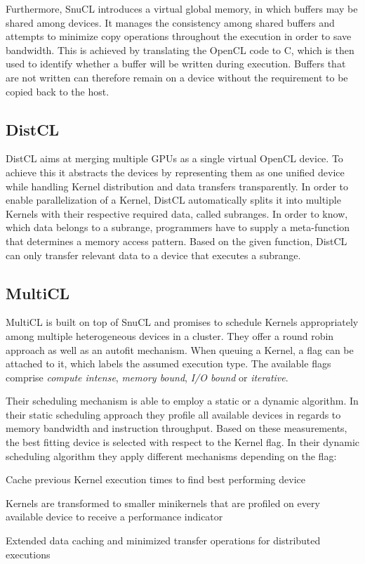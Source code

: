 Furthermore, SnuCL introduces a virtual global memory, in which buffers may be shared among devices. It manages the consistency among shared buffers and attempts to minimize copy operations throughout the execution in order to save bandwidth. This is achieved by translating the OpenCL code to C, which is then used to identify whether a buffer will be written during execution. Buffers that are not written can therefore remain on a device without the requirement to be copied back to the host.

\subsection*{DistCL}
DistCL aims at merging multiple GPUs as a single virtual OpenCL device\cite{distcl}. To achieve this it abstracts the devices by representing them as one unified device while handling Kernel distribution and data transfers transparently. In order to enable parallelization of a Kernel, DistCL automatically splits it into multiple Kernels with their respective required data, called subranges. In order to know, which data belongs to a subrange, programmers have to supply a meta-function that determines a memory access pattern. Based on the given function, DistCL can only transfer relevant data to a device that executes a subrange.

\subsection*{MultiCL}

MultiCL is built on top of SnuCL and promises to schedule Kernels appropriately among multiple heterogeneous devices in a cluster\cite{multicl}. They offer a round robin approach as well as an autofit mechanism. When queuing a Kernel, a flag can be attached to it, which labels the assumed execution type. The available flags comprise \textit{compute intense}, \textit{memory bound}, \textit{I/O bound} or \textit{iterative}.

Their scheduling mechanism is able to employ a static or a dynamic algorithm. In their static scheduling approach they profile all available devices in regards to memory bandwidth and instruction throughput. Based on these measurements, the best fitting device is selected with respect to the Kernel flag. In their dynamic scheduling algorithm they apply different mechanisms depending on the flag:

\begin{description}[align=left,leftmargin=0cm]
\item [Iterative] Cache previous Kernel execution times to find best performing device
\item [Compute-intensive] Kernels are transformed to smaller minikernels that are profiled on every available device to receive a performance indicator
\item [I/O-intensive] Extended data caching and minimized transfer operations for distributed executions
\end{description}


